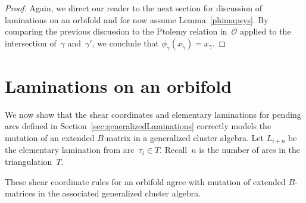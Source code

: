 \begin{proof}
Again, we direct our reader to the next section for discussion of laminations on an orbifold and for now assume Lemma~\ref{phimapsys}. By comparing the previous discussion to the Ptolemy relation in~$\mathcal{O}$ applied to the intersection of~$\gamma$ and~$\gamma'$, we conclude that $\phi_\gamma(x_{\widetilde{\gamma}}) = x_\gamma$.
\end{proof}

\section{Laminations on an orbifold}\label{sec:orbifoldLaminations}

We now show that the shear coordinates and elementary laminations for pending arcs defined in Section~\ref{sec:generalizedLaminations} correctly models the mutation of an extended $B$-matrix in a generalized cluster algebra.
Let $L_{i+n}$ be the elementary lamination from arc~$\tau_i \in T$. Recall~$n$ is the number of arcs in the triangulation~$T$.

\begin{Proposition}\label{prop:ShearCoordMutation}
These shear coordinate rules for an orbifold agree with mutation of extended $B$-matrices in the associated generalized cluster algebra.
\end{Proposition}

